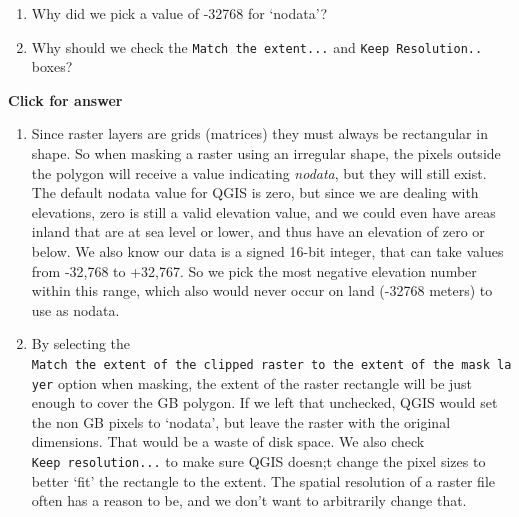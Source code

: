 \documentclass[
  letterpaper,
  DIV=11,
  numbers=noendperiod]{scrreprt}
\begin{document}
\begin{tcolorbox}[enhanced jigsaw, coltitle=black, toprule=.15mm, breakable, opacitybacktitle=0.6, left=2mm, colback=white, leftrule=.75mm, rightrule=.15mm, colbacktitle=quarto-callout-important-color!10!white, toptitle=1mm, titlerule=0mm, colframe=quarto-callout-important-color-frame, arc=.35mm, bottomtitle=1mm, opacityback=0, bottomrule=.15mm, title=\textcolor{quarto-callout-important-color}{\faExclamation}\hspace{0.5em}{Stop and Think}]

\begin{enumerate}
\def\labelenumi{\alph{enumi})}
\item
  Why did we pick a value of -32768 for `nodata'?
\item
  Why should we check the \texttt{Match\ the\ extent...} and
  \texttt{Keep\ Resolution..} boxes?
\end{enumerate}

\end{tcolorbox}

\begin{tcolorbox}[enhanced jigsaw, toprule=.15mm, breakable, left=2mm, colframe=quarto-callout-important-color-frame, colback=white, arc=.35mm, leftrule=.75mm, opacityback=0, rightrule=.15mm, bottomrule=.15mm]

\vspace{-3mm}\textbf{Click for answer}\vspace{3mm}

\begin{enumerate}
\def\labelenumi{\alph{enumi})}
\item
  Since raster layers are grids (matrices) they must always be
  rectangular in shape. So when masking a raster using an irregular
  shape, the pixels outside the polygon will receive a value indicating
  \emph{nodata}, but they will still exist. The default nodata value for
  QGIS is zero, but since we are dealing with elevations, zero is still
  a valid elevation value, and we could even have areas inland that are
  at sea level or lower, and thus have an elevation of zero or below. We
  also know our data is a signed 16-bit integer, that can take values
  from -32,768 to +32,767. So we pick the most negative elevation number
  within this range, which also would never occur on land (-32768
  meters) to use as nodata.
\item
  By selecting the
  \texttt{Match\ the\ extent\ of\ the\ clipped\ raster\ to\ the\ extent\ of\ the\ mask\ layer}
  option when masking, the extent of the raster rectangle will be just
  enough to cover the GB polygon. If we left that unchecked, QGIS would
  set the non GB pixels to `nodata', but leave the raster with the
  original dimensions. That would be a waste of disk space. We also
  check \texttt{Keep\ resolution...} to make sure QGIS doesn;t change
  the pixel sizes to better `fit' the rectangle to the extent. The
  spatial resolution of a raster file often has a reason to be, and we
  don't want to arbitrarily change that.
\end{enumerate}

\end{tcolorbox}
\end{document}
